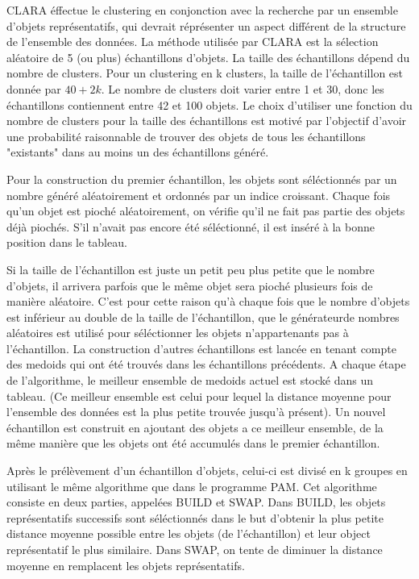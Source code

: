 \documentclass[report]{subfiles}
\begin{document}
CLARA éffectue le clustering en conjonction avec la recherche par un ensemble d'objets représentatifs, qui devrait réprésenter un aspect différent de la structure de l'ensemble des données.
La méthode utilisée par CLARA est la sélection aléatoire de 5 (ou plus) échantillons d'objets. La taille des échantillons dépend du nombre de clusters. Pour un clustering en k clusters, la taille de l'échantillon est donnée par $40+2k$. Le nombre de clusters doit varier entre 1 et 30, donc les échantillons contiennent entre 42 et 100 objets. Le choix d'utiliser une fonction du nombre de clusters pour la taille des échantillons est motivé par l'objectif d'avoir une probabilité raisonnable de trouver des objets de tous les échantillons "existants" dans au moins un des échantillons généré.

Pour la construction du premier échantillon, les objets sont séléctionnés par un nombre généré aléatoirement et ordonnés par un indice croissant. Chaque fois qu'un objet est pioché aléatoirement, on vérifie qu'il ne fait pas partie des objets déjà piochés. S'il n'avait pas encore été séléctionné, il est inséré à la bonne position dans le tableau.

Si la taille de l'échantillon est juste un petit peu plus petite que le nombre d'objets, il arrivera parfois que le même objet sera pioché  plusieurs fois de manière aléatoire. C'est pour cette raison qu'à chaque fois que le nombre d'objets est inférieur au double de la taille de l'échantillon, que le générateurde nombres aléatoires est utilisé pour séléctionner les objets n'appartenants pas à l'échantillon. La construction d'autres échantillons est lancée en tenant compte des medoids qui ont été trouvés dans les échantillons précédents. A chaque étape de l'algorithme, le meilleur ensemble de medoids actuel est stocké dans un tableau. (Ce meilleur ensemble est celui pour lequel la distance moyenne pour l'ensemble des données est la plus petite trouvée jusqu'à présent). Un nouvel échantillon est construit en ajoutant des objets a ce meilleur ensemble, de la même manière que les objets ont été accumulés dans le premier échantillon.

Après le prélèvement d'un échantillon d'objets, celui-ci est divisé en k groupes en utilisant le même algorithme que dans le programme PAM. Cet algorithme consiste en deux parties, appelées BUILD et SWAP. Dans BUILD, les objets représentatifs successifs sont séléctionnés dans le but d'obtenir la plus petite distance moyenne possible entre les objets (de l'échantillon) et leur object représentatif le plus similaire. Dans SWAP, on tente de diminuer la distance moyenne en remplacent les objets représentatifs.
\end{document}
